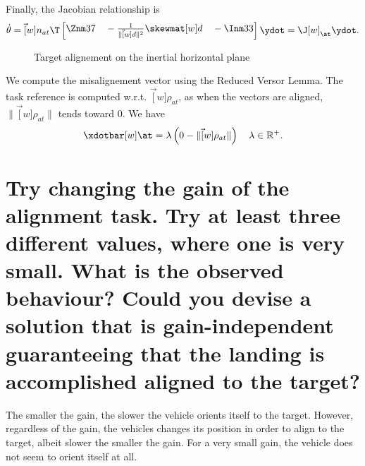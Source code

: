 \begin{parts}
\begin{solutionorbox}
			Finally, the Jacobian relationship is
			\[
				\dot{\theta} = \vec[w]{n_{at}}\T
				\begin{bmatrix}
					\Znm37\quad
					-\frac1{\lVert\vec[w]
					d\rVert^2}\skewmat[w]
					d\quad
					-\Inm33
				\end{bmatrix}
				\ydot
				= \J[w]_{\at}\ydot
				\mathrm{.}
			\]
		\end{solutionorbox}

		\begin{figure}[h]
			\begin{center}
		\end{center}

		\caption{Target alignement on the inertial horizontal
		plane}
		\label{fig:ex3_ta}
	\end{figure}

	\begin{solutionorbox}
		We compute the misalignement vector \vect{\rho} using the
		Reduced Versor Lemma. The task reference is computed w.r.t.
		$\vec[w]{\rho_{at}}$, as when the vectors are aligned,
		$\lVert\vec[w]{\rho_{at}}\rVert$ tends toward $0$. We have
		\[
			\xdotbar[w]\at =
			\lambda\left(0 - \lVert\vec[w]{\rho_{at}}\rVert\right) \quad
			\lambda\in\mathbb{R}^+
			\mathrm{.}
		\]
	\end{solutionorbox}

	\part{Try changing the gain of the alignment task. Try at least
		three different values, where one is very small. What is the observed
		behaviour? Could you devise a solution that is gain-independent guaranteeing
	that the landing is accomplished aligned to the target?}

	\begin{solutionorbox}
		The smaller the gain, the slower the vehicle orients itself to
		the target. However, regardless of the gain, the vehicles
		changes its position in order to align to the target, albeit
		slower the smaller the gain. For a very small gain, the vehicle
		does not seem to orient itself at all.


\end{solutionorbox}
\end{parts}
